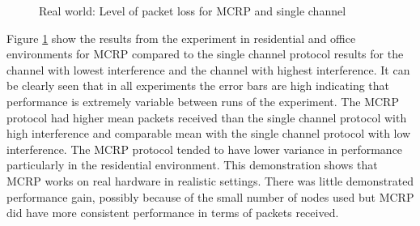 \begin{figure}
\centering
{}
\caption{Real world: Level of packet loss for MCRP and single channel}
\label{fig:hardware}
\end{figure}

Figure \ref{fig:hardware} show the results from the experiment in residential and office environments for MCRP compared to the single channel protocol results for the channel with lowest interference and the channel with highest interference.  It can be clearly seen that in all experiments the error bars are high indicating that performance is extremely variable between runs of the experiment.  The MCRP protocol had higher mean packets received than the single channel protocol with high interference and comparable mean with the single channel protocol with low interference.  The MCRP protocol tended to have lower variance in performance particularly in the residential environment.  This demonstration shows that MCRP works on real hardware in realistic settings.  There was little demonstrated performance gain, possibly because of the small number of nodes used but MCRP did have more consistent performance in terms of packets received.
